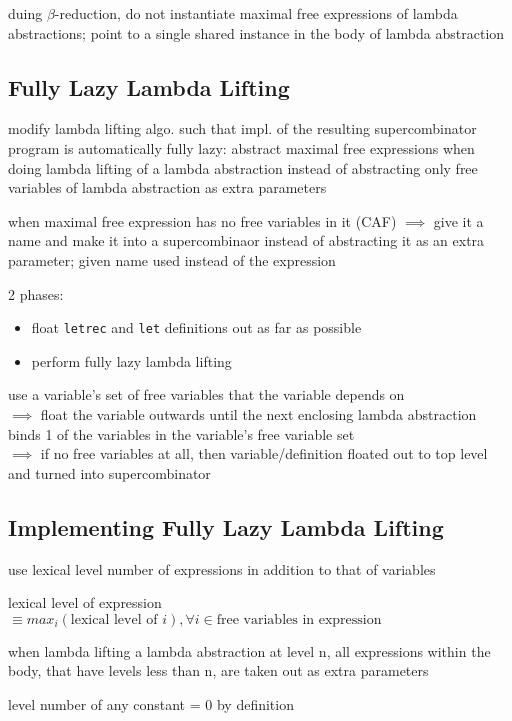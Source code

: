 \documentclass[8pt]{extarticle}
\begin{document}
\begin{multicols*}{2}
duing $\beta$-reduction, do not instantiate maximal free expressions of lambda abstractions; point to a single shared instance in the body of lambda abstraction

\subsection{Fully Lazy Lambda Lifting}

modify lambda lifting algo. such that impl. of the resulting supercombinator program is automatically fully lazy: abstract maximal free expressions when doing lambda lifting of a lambda abstraction instead of abstracting only free variables of lambda abstraction as extra parameters

when maximal free expression has no free variables in it (CAF) $\implies$ give it a name and make it into a supercombinaor instead of abstracting it as an extra parameter; given name used instead of the expression

2 phases:
\begin{itemize}
\item float \verb|letrec| and \verb|let| definitions out as far as possible
\item perform fully lazy lambda lifting
\end{itemize}

use a variable's set of free variables that the variable depends on\\
$\implies$ float the variable outwards until the next enclosing lambda abstraction binds 1 of the variables in the variable's free variable set\\
$\implies$ if no free variables at all, then variable/definition floated out to top level and turned into supercombinator

\subsection{Implementing Fully Lazy Lambda Lifting}

use lexical level number of expressions in addition to that of variables

lexical level of expression $\equiv max_i(\text{lexical level of } i), \forall i \in \text{free variables in expression}$ 

when lambda lifting a lambda abstraction at level n, all expressions within the body, that have levels less than n, are taken out as extra parameters

level number of any constant = 0 by definition


\end{multicols*}
\end{document}
